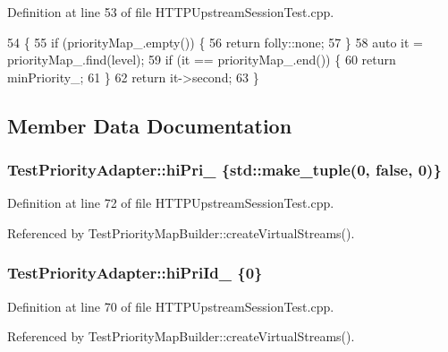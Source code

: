 Definition at line 53 of file H\+T\+T\+P\+Upstream\+Session\+Test.\+cpp.


\begin{DoxyCode}
54                               \{
55     \textcolor{keywordflow}{if} (priorityMap_.empty()) \{
56       \textcolor{keywordflow}{return} folly::none;
57     \}
58     \textcolor{keyword}{auto} it = priorityMap_.find(level);
59     \textcolor{keywordflow}{if} (it == priorityMap_.end()) \{
60       \textcolor{keywordflow}{return} minPriority_;
61     \}
62     \textcolor{keywordflow}{return} it->second;
63   \}
\end{DoxyCode}


\subsection{Member Data Documentation}
\subsubsection[{hi\+Pri\+\_\+}]{ Test\+Priority\+Adapter\+::hi\+Pri\+\_\+ \{std\+::make\+\_\+tuple(0, false, 0)\}}\label{classTestPriorityAdapter_a60e0180412966f4006c5721c498f22e8}


Definition at line 72 of file H\+T\+T\+P\+Upstream\+Session\+Test.\+cpp.



Referenced by Test\+Priority\+Map\+Builder\+::create\+Virtual\+Streams().

\subsubsection[{hi\+Pri\+Id\+\_\+}]{ Test\+Priority\+Adapter\+::hi\+Pri\+Id\+\_\+ \{0\}}\label{classTestPriorityAdapter_ab8188dc2de83b91483c765d4f2689ff7}


Definition at line 70 of file H\+T\+T\+P\+Upstream\+Session\+Test.\+cpp.



Referenced by Test\+Priority\+Map\+Builder\+::create\+Virtual\+Streams().


